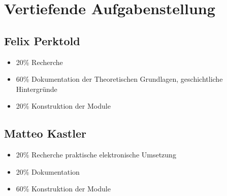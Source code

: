 \section{Vertiefende Aufgabenstellung}

\subsection{Felix Perktold}
\begin{itemize}
\item 20\% Recherche
\item 60\% Dokumentation der Theoretischen Grundlagen, geschichtliche Hintergründe
\item 20\% Konstruktion der Module
\end{itemize}

\subsection{Matteo Kastler}
\begin{itemize}
\item 20\% Recherche praktische elektronische Umsetzung
\item 20\% Dokumentation 
\item 60\% Konstruktion der Module
\end{itemize}
